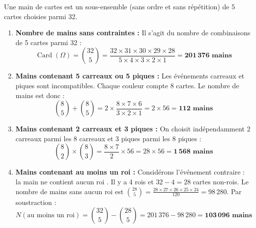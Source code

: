 \documentclass[11pt,a4paper]{article}
\begin{document}
\begin{correctionbox}
Une main de cartes est un sous-ensemble (sans ordre et sans répétition) de 5 cartes choisies parmi 32.
\begin{enumerate}
    \item \textbf{Nombre de mains sans contraintes :}
    Il s'agit du nombre de combinaisons de 5 cartes parmi 32 :
    \[
    \operatorname{Card}(\Omega) = \binom{32}{5} = \frac{32 \times 31 \times 30 \times 29 \times 28}{5 \times 4 \times 3 \times 2 \times 1} = \mathbf{201\,376\text{ mains}}
    \]

    \item \textbf{Mains contenant 5 carreaux ou 5 piques :}
    Les événements  carreaux \fg{} et  piques \fg{} sont incompatibles.
    Chaque couleur compte 8 cartes. Le nombre de mains est donc :
    \[
    \binom{8}{5} + \binom{8}{5} = 2 \times \frac{8 \times 7 \times 6}{3 \times 2 \times 1} = 2 \times 56 = \mathbf{112\text{ mains}}
    \]

    \item \textbf{Mains contenant 2 carreaux et 3 piques :}
    On choisit indépendamment 2 carreaux parmi les 8 carreaux et 3 piques parmi les 8 piques :
    \[
    \binom{8}{2} \times \binom{8}{3} = \frac{8 \times 7}{2} \times 56 = 28 \times 56 = \mathbf{1\,568\text{ mains}}
    \]

    \item \textbf{Mains contenant au moins un roi :}
    Considérons l'événement contraire : \og la main ne contient aucun roi \fg{}.
    Il y a 4 rois et $32 - 4 = 28$ cartes non-rois.
    Le nombre de mains sans aucun roi est $\binom{28}{5} = \frac{28 \times 27 \times 26 \times 25 \times 24}{120} = 98\,280$.
    Par soustraction :
    \[
    N(\text{au moins un roi}) = \binom{32}{5} - \binom{28}{5} = 201\,376 - 98\,280 = \mathbf{103\,096\text{ mains}}
    \]


\end{enumerate}
\end{correctionbox}
\end{document}
